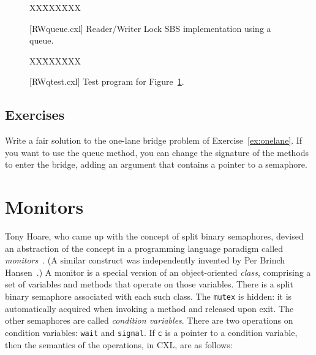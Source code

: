 \documentclass{report}
\newcommand{\cxlsource}[1]{
\begin{tabbing}
XX\=XXX\=XXX\kill
    
\end{tabbing}
}
\newenvironment{code}{
\tcolorbox
}{
\endtcolorbox
}
\begin{document}
\begin{figure}
\begin{code}
{\small
\cxlsource{RWqueue}
}
\end{code}
\caption{[RWqueue.cxl] Reader/Writer Lock SBS implementation using a queue.}
\label{fig:RWqueue}
\end{figure}

\begin{figure}
\begin{code}
\cxlsource{RWqtest}
\end{code}
\caption{[RWqtest.cxl] Test program for Figure~\ref{fig:RWqueue}.}
\label{fig:RWqtest}
\end{figure}

\section*{Exercises}
\begin{problems}
\item Write a fair solution to the one-lane bridge problem of
Exercise~\ref{ex:onelane}.
If you want to use the queue method, you can change the signature of the
methods to enter the bridge, adding an argument that contains a pointer to a
semaphore.
\end{problems}

\chapter{Monitors}
\label{ch:monitors}


Tony Hoare, who came up with the concept of split binary semaphores, devised
an abstraction of the concept in a programming language paradigm called
\emph{monitors}~\cite{Hoare74}.
(A similar construct was independently invented by Per Brinch Hansen~\cite{BH73}.)
A monitor is a special version of an object-oriented \emph{class}, comprising
a set of variables and methods that operate on those variables.
There is a split binary semaphore associated with each such class.
The \texttt{mutex} is hidden: it is automatically acquired when invoking a
method and released upon exit.
The other semaphores are called \emph{condition variables}.
There are two operations on condition variables: \texttt{wait}
and
\texttt{signal}.
If \texttt{c} is a pointer to a condition variable, then the semantics of the
operations, in CXL, are as follows:
\end{document}
